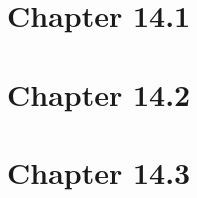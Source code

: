 \documentclass{article}
\begin{document}
\maketitle
\tableofcontents
\newpage

\section{Chapter 14.1}


\section{Chapter 14.2}


\section{Chapter 14.3}

\end{document}
